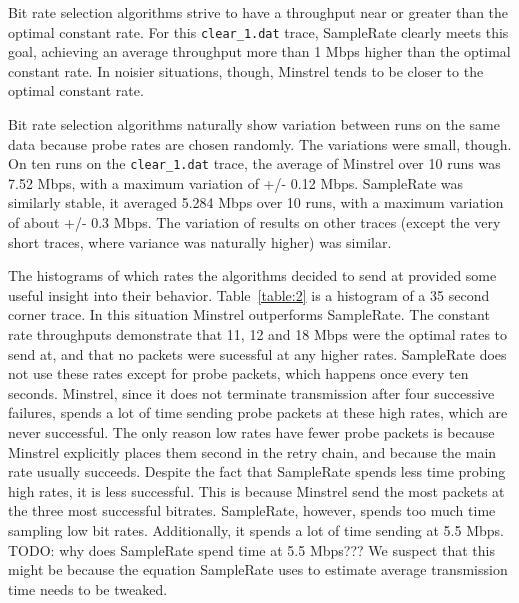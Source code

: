 \documentclass[letterpaper,twocolumn,10pt]{article}
\begin{document}
Bit rate selection algorithms strive to have a throughput near or
greater than the optimal constant rate. For this \texttt{clear\_1.dat}
trace, SampleRate clearly meets this goal, achieving an average
throughput more than 1 Mbps higher than the optimal constant rate. In
noisier situations, though, Minstrel tends to be closer to the optimal
constant rate.

Bit rate selection algorithms naturally show variation between runs on
the same data because probe rates are chosen randomly. The variations
were small, though. On ten runs on the \texttt{clear\_1.dat} trace,
the average of Minstrel over 10 runs was 7.52 Mbps, with a maximum
variation of +/- 0.12 Mbps. SampleRate was similarly stable, it
averaged 5.284 Mbps over 10 runs, with a maximum variation of about
+/- 0.3 Mbps. The variation of results on other traces (except the
very short traces, where variance was naturally higher) was similar.

The histograms of which rates the algorithms decided to send at
provided some useful insight into their behavior. Table~\ref{table:2}
is a histogram of a 35 second corner trace. In this situation Minstrel
outperforms SampleRate. The constant rate throughputs demonstrate that
11, 12 and 18 Mbps were the optimal rates to send at, and that no
packets were sucessful at any higher rates. SampleRate does not use
these rates except for probe packets, which happens once every ten
seconds. Minstrel, since it does not terminate transmission after four
successive failures, spends a lot of time sending probe packets at
these high rates, which are never successful. The only reason low
rates have fewer probe packets is because Minstrel explicitly places
them second in the retry chain, and because the main rate usually
succeeds. Despite the fact that SampleRate spends less time probing
high rates, it is less successful. This is because Minstrel send the
most packets at the three most successful bitrates. SampleRate,
however, spends too much time sampling low bit rates. Additionally, it
spends a lot of time sending at 5.5 Mbps. TODO: why does SampleRate
spend time at 5.5 Mbps??? We suspect that this might be because the
equation SampleRate uses to estimate average transmission time needs
to be tweaked.
\end{document}
